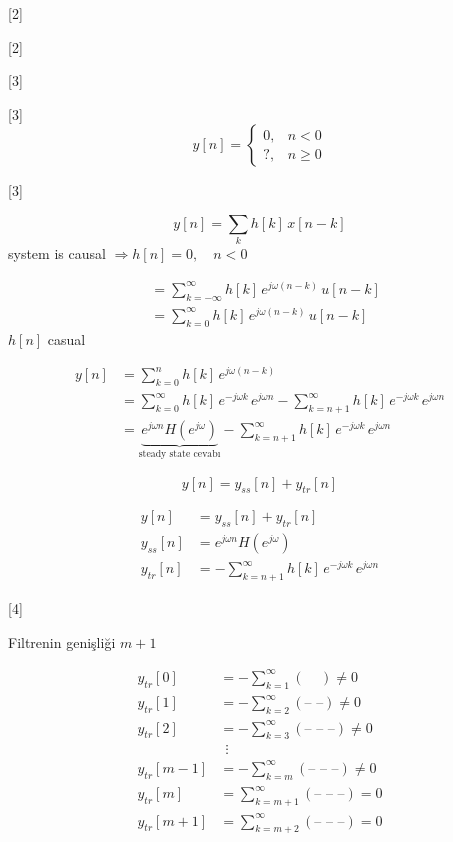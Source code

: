 \documentclass[11pt,a4paper]{article}
\begin{document}
[2]

[2]

[3]

[3]
\[ y[n] = \begin{cases} 0, & n<0 \\ ?, & n\geq 0 \end{cases} \]

[3]

\[ y[n] = \sum_{k} h[k]\,x[n-k] \]
system is causal $\Rightarrow h[n]=0,\quad n<0$

\[ \begin{aligned}
&= \sum_{k=-\infty}^{\infty} h[k]\,e^{j\omega(n-k)}\,u[n-k] \\
&= \sum_{k=0}^{\infty} h[k]\,e^{j\omega(n-k)}\,u[n-k]
\end{aligned} \]
$h[n]$ casual


\[ \begin{aligned}
y[n] &= \sum_{k=0}^{n} h[k]\,e^{j\omega(n-k)} \\
&= \sum_{k=0}^{\infty} h[k]\,e^{-j\omega k}\,e^{j\omega n} - \sum_{k=n+1}^{\infty} h[k]\,e^{-j\omega k}\,e^{j\omega n} \\
&= \underbrace{e^{j\omega n}H(e^{j\omega})}_{\text{steady state cevabı}} - \sum_{k=n+1}^{\infty} h[k]\,e^{-j\omega k}\,e^{j\omega n}
\end{aligned} \]

\[ y[n] = y_{ss}[n] + y_{tr}[n] \]

\[ \begin{aligned}
y[n] &= y_{ss}[n] + y_{tr}[n] \\
y_{ss}[n] &= e^{j\omega n}H(e^{j\omega}) \\
y_{tr}[n] &= -\sum_{k=n+1}^{\infty} h[k]\,e^{-j\omega k}\,e^{j\omega n}
\end{aligned} \]

[4]

Filtrenin genişliği $m+1$

\[ \begin{aligned}
y_{tr}[0] &= -\sum_{k=1}^{\infty} (\ \ \ \ \ ) \neq 0 \\
y_{tr}[1] &= -\sum_{k=2}^{\infty} (\text{-- --}) \neq 0 \\
y_{tr}[2] &= -\sum_{k=3}^{\infty} (\text{-- -- --}) \neq 0 \\
&\ \ \vdots \\
y_{tr}[m-1] &= -\sum_{k=m}^{\infty} (\text{-- -- --}) \neq 0 \\
y_{tr}[m] &= \sum_{k=m+1}^{\infty} (\text{-- -- --}) = 0 \\
y_{tr}[m+1] &= \sum_{k=m+2}^{\infty} (\text{-- -- --}) = 0
\end{aligned} \]
\end{document}
